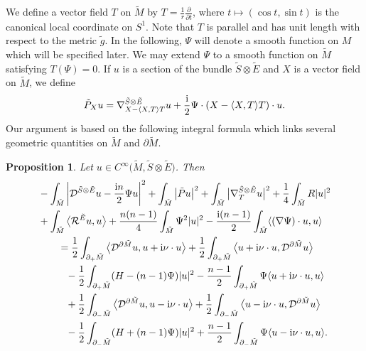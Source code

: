 \documentclass[pdftex]{sigma}
\numberwithin{equation}{section}
\newtheorem{Proposition}[Theorem]{Proposition}
 { \theoremstyle{definition}
\newtheorem{Definition}[Theorem]{Definition}
\newtheorem{Note}[Theorem]{Note}
\newtheorem{Example}[Theorem]{Example}
\newtheorem{Remark}[Theorem]{Remark} }
\begin{document}
We define a vector field $T$ on $\tilde{M}$ by $T = \frac{1}{r} \frac{\partial}{\partial t}$, where $t \mapsto (\cos t,\sin t)$ is the canonical local coordinate on $S^1$. Note that $T$ is parallel and has unit length with respect to the metric $\tilde{g}$. In the following, $\Psi$ will denote a smooth function on $M$ which will be specified later. We may extend $\Psi$ to a smooth function on $\tilde{M}$ satisfying $T(\Psi) = 0$. If $u$ is a section of the bundle $\tilde{S} \otimes \tilde{E}$ and $X$ is a vector field on $\tilde{M}$, we define
\begin{equation} \label{def:tildeP}
\tilde{P}_X u = \nabla_{X - \langle X,T \rangle T}^{\tilde{S} \otimes \tilde{E}} u + \frac{\rm i}{2} \Psi \cdot (X - \langle X,T \rangle T) \cdot u.
\end{equation}
Our argument is based on the following integral formula which links several geometric quantities on $\tilde{M}$ and $\partial \tilde{M}$.

\begin{Proposition}
\label{integral_formula_even_dim}
Let $u \in C^\infty\big(\tilde{M},\tilde{S} \otimes \tilde{E}\big)$. Then
\begin{align*}
& - \int_{\tilde{M}} \left|\mathcal{D}^{\tilde{S} \otimes \tilde{E}} u - \frac{{\rm i}n}{2} \Psi u\right|^2 + \int_{\tilde{M}} \big|\tilde{P} u\big|^2 + \int_{\tilde{M}} \big|\nabla_T^{\tilde{S} \otimes \tilde{E}} u\big|^2 + \frac{1}{4} \int_{\tilde{M}} R |u|^2 \\
&+ \int_{\tilde{M}} \big\langle \mathcal{R}^{\tilde{E}} u,u \big\rangle + \frac{n(n-1)}{4} \int_{\tilde{M}} \Psi^2 |u|^2 - \frac{{\rm i}(n-1)}{2} \int_{\tilde{M}} \langle (\nabla \Psi) \cdot u,u \rangle \\
&\qquad= \frac{1}{2} \int_{\partial_+ \tilde{M}} \big\langle \mathcal{D}^{\partial \tilde{M}} u,u + {\rm i} \nu \cdot u \big\rangle + \frac{1}{2} \int_{\partial_+ \tilde{M}} \big\langle u + {\rm i} \nu \cdot u,\mathcal{D}^{\partial \tilde{M}} u \big\rangle \\
&\phantom{\qquad=}{} - \frac{1}{2} \int_{\partial_+ \tilde{M}} (H-(n-1)\Psi) |u|^2 - \frac{n-1}{2} \int_{\partial_+ \tilde{M}} \Psi \langle u + {\rm i} \nu \cdot u,u \rangle \\
&\phantom{\qquad=}{} + \frac{1}{2} \int_{\partial_- \tilde{M}} \big\langle \mathcal{D}^{\partial \tilde{M}} u,u - {\rm i} \nu \cdot u \big\rangle + \frac{1}{2} \int_{\partial_- \tilde{M}} \big\langle u - {\rm i} \nu \cdot u,\mathcal{D}^{\partial \tilde{M}} u \big\rangle \\
&\phantom{\qquad=}{} - \frac{1}{2} \int_{\partial_- \tilde{M}} (H+(n-1)\Psi) |u|^2 + \frac{n-1}{2} \int_{\partial_- \tilde{M}} \Psi \langle u - {\rm i} \nu \cdot u,u \rangle.
\end{align*}
\end{Proposition}
\end{document}
